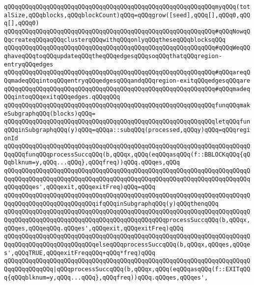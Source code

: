 \verb|qQQqqQQqqQQqqQQqqQQqqQQqqQQqqQQqqQQqqQQqqQQqqQQqqQQqqQQqqQQqmyqQQq(totalSize,qQQqblocks,qQQqblockCount)qQQq=qQQqgrow([seed],qQQq[],qQQq0,qQQq[],qQQq0)|\newline
\newline
\verb|qQQqqQQqqQQqqQQqqQQqqQQqqQQqqQQqqQQqqQQqqQQqqQQqqQQqqQQqqQQq#qQQqNowqQQqcreateqQQqaqQQqclusterqQQqwithqQQqonlyqQQqtheseqQQqblocksqQQq|\newline
\verb|qQQqqQQqqQQqqQQqqQQqqQQqqQQqqQQqqQQqqQQqqQQqqQQqqQQqqQQqqQQq#qQQqWeqQQqhaveqQQqtoqQQqupdateqQQqtheqQQqedgesqQQqsoqQQqthatqQQqregion-entryqQQqedges|\newline
\verb|qQQqqQQqqQQqqQQqqQQqqQQqqQQqqQQqqQQqqQQqqQQqqQQqqQQqqQQqqQQq#qQQqareqQQqmadeqQQqintoqQQqentryqQQqedgesqQQqandqQQqregion-exitqQQqedgesqQQqare|\newline
\verb|qQQqqQQqqQQqqQQqqQQqqQQqqQQqqQQqqQQqqQQqqQQqqQQqqQQqqQQqqQQq#qQQqmadeqQQqintoqQQqexitqQQqedges.qQQqqQQq|\newline
\newline
\verb|qQQqqQQqqQQqqQQqqQQqqQQqqQQqqQQqqQQqqQQqqQQqqQQqqQQqqQQqqQQqfunqQQqmakeSubgraphqQQq(blocks)qQQq=|\newline
\verb|qQQqqQQqqQQqqQQqqQQqqQQqqQQqqQQqqQQqqQQqqQQqqQQqqQQqqQQqqQQqletqQQqfunqQQqinSubgraphqQQq(y)qQQq=qQQqa::subqQQq(processed,qQQqy)qQQq=qQQqregionId|\newline
\verb|qQQqqQQqqQQqqQQqqQQqqQQqqQQqqQQqqQQqqQQqqQQqqQQqqQQqqQQqqQQqqQQqqQQqqQQqqQQqfunqQQqprocessSuccqQQq(b,qQQqx,qQQq(eqQQqasqQQq(f::BBLOCKqQQq{qQQqblknum=y,qQQq...qQQq},qQQqfreq))qQQq.qQQqes,qQQq|\newline
\verb|qQQqqQQqqQQqqQQqqQQqqQQqqQQqqQQqqQQqqQQqqQQqqQQqqQQqqQQqqQQqqQQqqQQqqQQqqQQqqQQqqQQqqQQqqQQqqQQqqQQqqQQqqQQqqQQqqQQqqQQqqQQqqQQqqQQqqQQqqQQqqQQqqQQqes',qQQqexit,qQQqexitFreq)qQQq=qQQq|\newline
\verb|qQQqqQQqqQQqqQQqqQQqqQQqqQQqqQQqqQQqqQQqqQQqqQQqqQQqqQQqqQQqqQQqqQQqqQQqqQQqqQQqqQQqqQQqqQQqqQQqifqQQqinSubgraphqQQq(y)qQQqthenqQQq|\newline
\verb|qQQqqQQqqQQqqQQqqQQqqQQqqQQqqQQqqQQqqQQqqQQqqQQqqQQqqQQqqQQqqQQqqQQqqQQqqQQqqQQqqQQqqQQqqQQqqQQqqQQqqQQqqQQqqQQqqQQqprocessSuccqQQq(b,qQQqx,qQQqes,qQQqeqQQq.qQQqes',qQQqexit,qQQqexitFreq)qQQq|\newline
\verb|qQQqqQQqqQQqqQQqqQQqqQQqqQQqqQQqqQQqqQQqqQQqqQQqqQQqqQQqqQQqqQQqqQQqqQQqqQQqqQQqqQQqqQQqqQQqqQQqelseqQQqprocessSuccqQQq(b,qQQqx,qQQqes,qQQqes',qQQqTRUE,qQQqexitFreqqQQq+qQQq*freq)qQQq|\newline
\verb|qQQqqQQqqQQqqQQqqQQqqQQqqQQqqQQqqQQqqQQqqQQqqQQqqQQqqQQqqQQqqQQqqQQqqQQqqQQqqQQqqQQq|\verb#|qQQqprocessSuccqQQq(b,qQQqx,qQQq(eqQQqasqQQq(f::EXITqQQq{qQQqblknum=y,qQQq...qQQq},qQQqfreq))qQQq.qQQqes,qQQqes',#\newline
